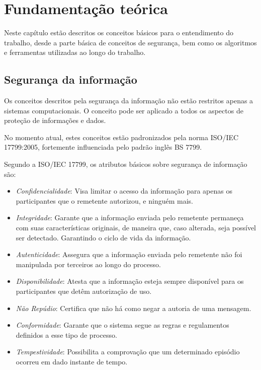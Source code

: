 \documentclass{ufsctex/ufsctex}
\begin{document}
\chapter{Fundamentação teórica}

Neste capítulo estão descritos os conceitos básicos para o entendimento do
trabalho, desde a parte básica de conceitos de segurança, bem como os
algoritmos e ferramentas utilizadas ao longo do trabalho.

\section{Segurança da informação}

Os conceitos descritos pela segurança da informação não estão restritos apenas
a sistemas computacionais. O conceito pode ser aplicado a todos os aspectos de
proteção de informações e dados. 

No momento atual, estes conceitos estão padronizados pela norma ISO/IEC
17799:2005, fortemente influenciada pelo padrão inglês BS 7799.

Segundo a ISO/IEC 17799, os atributos básicos sobre segurança de informação
são:

\begin{itemize}
	\item \textit{Confidencialidade}: Visa limitar o acesso da informação para
		apenas os participantes que o remetente autorizou, e ninguém mais.
	\item \textit{Integridade}: Garante que a informação enviada pelo remetente
		permaneça com suas características originais, de maneira que, caso
		alterada, seja possível ser detectado. Garantindo o ciclo de vida da
		informação.
	\item \textit{Autenticidade}: Assegura que a informação enviada pelo
		remetente não foi manipulada por terceiros ao longo do processo.
	\item \textit{Disponibilidade}: Atesta que a informação esteja sempre
		disponível para os participantes que detêm autorização de uso.
	\item \textit{Não Repúdio}: Certifica que não há como negar a autoria de
		uma mensagem.
	\item \textit{Conformidade}: Garante que o sistema segue as regras e
		regulamentos definidos a esse tipo de processo.
	\item \textit{Tempestividade}: Possibilita a comprovação que um determinado
		episódio ocorreu em dado instante de tempo.
\end{itemize}
\cite{ISO17799}
\end{document}
